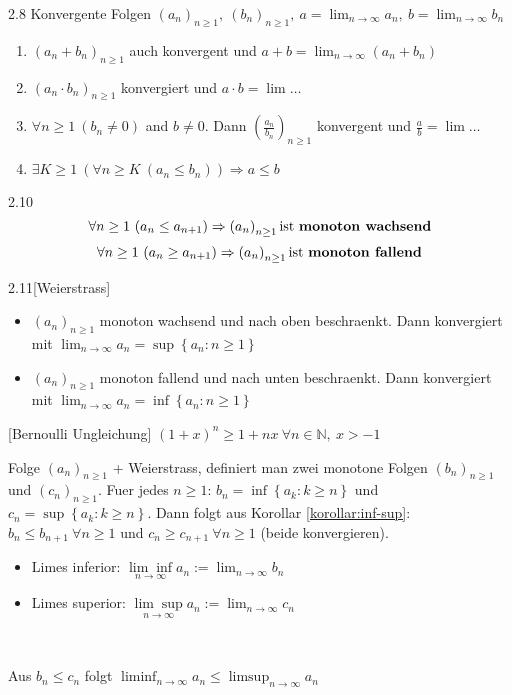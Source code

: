 \documentclass[8pt,a4paper,twocolumn,table]{extarticle}
\newcommand{\N}{\mathbb{N}}
\newcommand{\seq}[1]{\left( #1_n \right)_{n \ge 1}}
\begin{document}
\begin{satz}{2.8}
    Konvergente Folgen $\seq{a},\ \seq{b},\ a = \lim_{n \to \infty} a_n,\ b = \lim_{n \to \infty} b_n$
    \begin{enumerate}
        \item $(a_n + b_n)_{n \ge 1}$ auch konvergent und $a + b = \lim_{n \to \infty} (a_n + b_n)$
        \item $(a_n \cdot b_n)_{n \ge 1}$ konvergiert und $a \cdot b = \lim \dots$
        \item $\forall n \ge 1\ (b_n \ne 0)$ and $b \ne 0$. Dann $\left(\frac{a_n}{b_n}\right)_{n \ge 1}$ konvergent und $\frac{a}{b} = \lim \dots$
        \item $\exists K \ge 1\ \left(\forall n \ge K\ (a_n \le b_n)\right) \Rightarrow a \le b$
    \end{enumerate}
\end{satz}

\begin{definition}{2.10}
    \[\forall n \ge 1\ (a_n \le a_{n + 1}) \Rightarrow \seq{a} \mbox{ist \textbf{monoton wachsend}}\]
    \[\forall n \ge 1\ (a_n \ge a_{n + 1}) \Rightarrow \seq{a} \mbox{ist \textbf{monoton fallend}}\]
\end{definition}

\begin{satz}{2.11}[Weierstrass]
    \begin{itemize}
        \item $\seq{a}$ monoton wachsend und nach oben beschraenkt. Dann konvergiert mit $\lim_{n \to \infty} a_n = \sup \left\{ a_n : n \ge 1 \right\}$
        \item $\seq{a}$ monoton fallend und nach unten beschraenkt. Dann konvergiert mit $\lim_{n \to \infty} a_n = \inf \left\{ a_n : n \ge 1 \right\}$
    \end{itemize}
\end{satz}

\begin{lemma}{}[Bernoulli Ungleichung]
    $(1 + x)^n \ge 1 + nx\ \forall n \in \N,\ x > -1$
\end{lemma}

\begin{definition}
    Folge $\seq{a}$ + Weierstrass, definiert man zwei monotone Folgen $\seq{b}$ und $\seq{c}$.
    Fuer jedes $n \ge 1$: $b_n = \inf \left\{ a_k : k \ge n \right\}$ und $c_n = \sup \left\{ a_k : k \ge n \right\}$.
    Dann folgt aus Korollar \ref{korollar:inf-sup}:
    $b_n \le b_{n + 1}\ \forall n \ge 1$ und $c_n \ge c_{n + 1}\ \forall n \ge 1$ (beide konvergieren).

    \begin{itemize}
        \item Limes inferior: $\underset{n \to \infty}{\lim \inf} a_n := \lim_{n \to \infty} b_n$
        \item Limes superior: $\underset{n \to \infty}{\lim \sup} a_n := \lim_{n \to \infty} c_n$
    \end{itemize}\

    Aus $b_n \le c_n$ folgt $\liminf_{n \to \infty} a_n \le \limsup_{n \to \infty} a_n$
\end{definition}
\end{document}
